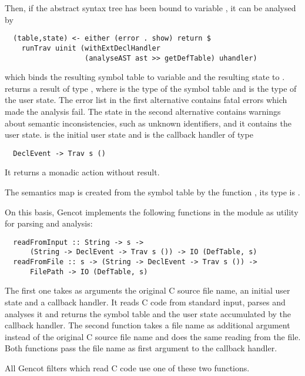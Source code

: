 Then, if the abstract syntax tree has been bound to variable , it can be analysed by
\begin{verbatim}
  (table,state) <- either (error . show) return $ 
    runTrav uinit (withExtDeclHandler
                   (analyseAST ast >> getDefTable) uhandler)
\end{verbatim}
which binds the resulting symbol table to variable  and the resulting state to . 
returns a result of type , where 
is the type of the symbol table and  is the type of the user state. The error list in the first alternative contains 
fatal errors which made the analysis fail. The state in the second alternative contains warnings about semantic inconsistencies, 
such as unknown identifiers, and it contains the user state.  is the initial user state and 
is the callback handler of type
\begin{verbatim}
  DeclEvent -> Trav s ()
\end{verbatim}
It returns a monadic action without result.

The semantics map is created from the symbol table by the function , its type is .

On this basis, Gencot implements the following functions in the module  as utility for parsing and analysis:
\begin{verbatim}
  readFromInput :: String -> s ->
      (String -> DeclEvent -> Trav s ()) -> IO (DefTable, s)
  readFromFile :: s -> (String -> DeclEvent -> Trav s ()) ->
      FilePath -> IO (DefTable, s)
\end{verbatim}
The first one takes as arguments the original C source file name, an initial user state and a callback handler.
It reads C code from standard input, parses and analyses it and returns the symbol table and the user state
accumulated by the callback handler. The second function takes a file name as additional argument instead of
the original C source file name and does the same reading from the file. Both functions pass the file name
as first argument to the callback handler.

All Gencot filters which read C code use one of these two functions.

